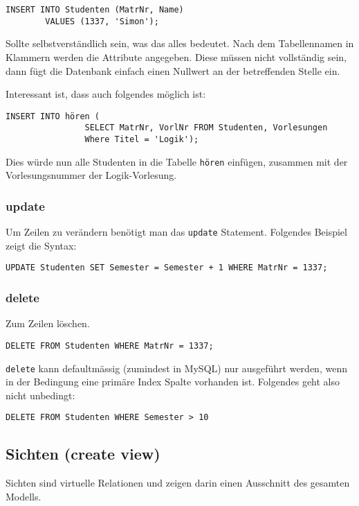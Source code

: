 \begin{lstlisting}[caption={Beispiel mit Insert}]
    INSERT INTO Studenten (MatrNr, Name)
        VALUES (1337, 'Simon');
\end{lstlisting}

Sollte selbstverständlich sein, was das alles bedeutet. Nach dem Tabellennamen in Klammern werden die Attribute angegeben. Diese müssen nicht vollständig sein, dann fügt die Datenbank einfach einen Nullwert an der betreffenden Stelle ein.

Interessant ist, dass auch folgendes möglich ist:
\begin{lstlisting}[caption={Beispiel mit Insert aus anderer Tabelle}]
    INSERT INTO hören (
                SELECT MatrNr, VorlNr FROM Studenten, Vorlesungen
                Where Titel = 'Logik');
\end{lstlisting}
Dies würde nun alle Studenten in die Tabelle \texttt{hören} einfügen, zusammen mit der Vorlesungsnummer der Logik-Vorlesung.

\subsubsection{update}
Um Zeilen zu verändern benötigt man das \texttt{update} Statement. Folgendes Beispiel zeigt die Syntax:

\begin{lstlisting}[caption={update Beispiel}]
    UPDATE Studenten SET Semester = Semester + 1 WHERE MatrNr = 1337;
\end{lstlisting}

\subsubsection{delete}
Zum Zeilen löschen.

\begin{lstlisting}[caption={delete Beispiel}]
    DELETE FROM Studenten WHERE MatrNr = 1337;
\end{lstlisting}

\texttt{delete} kann defaultmässig (zumindest in MySQL) nur ausgeführt werden, wenn in der Bedingung eine primäre Index Spalte vorhanden ist. Folgendes geht also nicht unbedingt:

\begin{lstlisting}[caption={delete ohne Index}]
    DELETE FROM Studenten WHERE Semester > 10
\end{lstlisting}

\subsection{Sichten (create view)}
Sichten sind virtuelle Relationen und zeigen darin einen Ausschnitt des gesamten Modells. 


